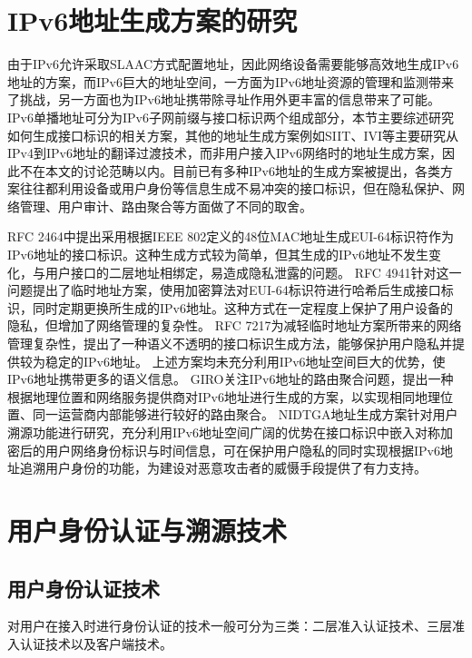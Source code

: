   \section{IPv6地址生成方案的研究}
  \label{survey:generation}
  由于IPv6允许采取SLAAC方式配置地址，因此网络设备需要能够高效地生成IPv6地址的方案，而IPv6巨大的地址空间，一方面为IPv6地址资源的管理和监测带来了挑战，另一方面也为IPv6地址携带除寻址作用外更丰富的信息带来了可能。IPv6单播地址可分为IPv6子网前缀与接口标识两个组成部分\cite{RFC4291}，本节主要综述研究如何生成接口标识的相关方案，其他的地址生成方案例如SIIT\cite{RFC2765}、IVI\cite{RFC6219}等主要研究从IPv4到IPv6地址的翻译过渡技术，而非用户接入IPv6网络时的地址生成方案，因此不在本文的讨论范畴以内。目前已有多种IPv6地址的生成方案被提出，各类方案往往都利用设备或用户身份等信息生成不易冲突的接口标识，但在隐私保护、网络管理、用户审计、路由聚合等方面做了不同的取舍。

  RFC 2464\cite{RFC2464}中提出采用根据IEEE 802定义的48位MAC地址生成EUI-64标识符作为IPv6地址的接口标识。这种生成方式较为简单，但其生成的IPv6地址不发生变化，与用户接口的二层地址相绑定，易造成隐私泄露的问题。
  RFC 4941\cite{RFC4941}针对这一问题提出了临时地址方案，使用加密算法对EUI-64标识符进行哈希后生成接口标识，同时定期更换所生成的IPv6地址。这种方式在一定程度上保护了用户设备的隐私，但增加了网络管理的复杂性。
  RFC 7217\cite{RFC7217}为减轻临时地址方案所带来的网络管理复杂性，提出了一种语义不透明的接口标识生成方法，能够保护用户隐私并提供较为稳定的IPv6地址。
  上述方案均未充分利用IPv6地址空间巨大的优势，使IPv6地址携带更多的语义信息。
  GIRO\cite{oliveira2007geographically}关注IPv6地址的路由聚合问题，提出一种根据地理位置和网络服务提供商对IPv6地址进行生成的方案，以实现相同地理位置、同一运营商内部能够进行较好的路由聚合。
  NIDTGA地址生成方案\cite{liu2015building}针对用户溯源功能进行研究，充分利用IPv6地址空间广阔的优势在接口标识中嵌入对称加密后的用户网络身份标识与时间信息，可在保护用户隐私的同时实现根据IPv6地址追溯用户身份的功能，为建设对恶意攻击者的威慑手段提供了有力支持。

  \section{用户身份认证与溯源技术}
  \label{survey:identity}
  
      \subsection{用户身份认证技术}
      \label{survey:identity:authenticate}
      对用户在接入时进行身份认证的技术一般可分为三类：二层准入认证技术、三层准入认证技术以及客户端技术。
      
